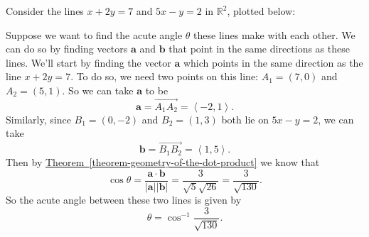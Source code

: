 \documentclass[10pt,]{book}
\theoremstyle{ptxplainnotitle}
\theoremstyle{ptxplaintitle}
\theoremstyle{ptxplainnotitle}
\theoremstyle{ptxplaintitle}
\theoremstyle{ptxplainnotitle}
\theoremstyle{ptxplaintitle}
\theoremstyle{ptxdefinitionnotitle}
\theoremstyle{ptxdefinitiontitle}
\theoremstyle{ptxdefinitionnotitle}
\theoremstyle{ptxdefinitiontitle}
\theoremstyle{ptxdefinitionnotitle}
\theoremstyle{ptxdefinitiontitle}
\theoremstyle{ptxdefinitionnotitle}
\theoremstyle{ptxdefinitiontitle}
\theoremstyle{ptxdefinitionnotitle}
\theoremstyle{ptxdefinitiontitle}
\numberwithin{equation}{section}
\newcommand{\RR}{\mathbb{R}}
\newcommand{\vv}[1]{\mathbf{#1}}
\newcommand{\dotprod}[1]{\left\langle #1 \right\rangle}
\begin{document}
\begin{example}\label{example-finding-angles-between-lines}
\hypertarget{p-805}{}%
Consider the lines \(x+2y = 7\) and \(5x-y = 2\) in \(\RR^{2}\), plotted below:%
\begin{figure}
\centering
{
}
\end{figure}
\hypertarget{p-806}{}%
Suppose we want to find the acute angle \(\theta\) these lines make with each other. We can do so by finding vectors \(\vv{a}\) and \(\vv{b}\) that point in the same directions as these lines. We'll start by finding the vector \(\vv{a}\) which points in the same direction as the line \(x+2y=7\). To do so, we need two points on this line: \(A_{1} = (7,0)\) and \(A_{2} = (5,1)\). So we can take \(\vv{a}\) to be%
%
\begin{equation*}
\vv{a} = \overrightarrow{A_{1}A_{2}} = \dotprod{-2,1}.
\end{equation*}
\hypertarget{p-807}{}%
Similarly, since \(B_{1} = (0,-2)\) and \(B_{2} = (1,3)\) both lie on \(5x-y = 2\), we can take%
%
\begin{equation*}
\vv{b} = \overrightarrow{B_{1}B_{2}} = \dotprod{1,5}.
\end{equation*}
\hypertarget{p-808}{}%
Then by \hyperref[theorem-geometry-of-the-dot-product]{Theorem~\ref{theorem-geometry-of-the-dot-product}} we know that%
%
\begin{equation*}
\cos\theta = \frac{\vv{a}\cdot\vv{b}}{|\vv{a}||\vv{b}|} = \frac{3}{\sqrt{5}\sqrt{26}} = \frac{3}{\sqrt{130}}.
\end{equation*}
\hypertarget{p-809}{}%
So the acute angle between these two lines is given by%
%
\begin{equation*}
\theta = \cos^{-1}\frac{3}{\sqrt{130}}.
\end{equation*}
\end{example}
\typeout{************************************************}
\typeout{************************************************}
\end{document}
